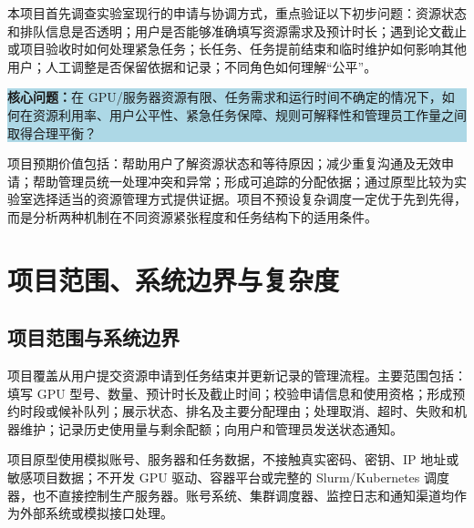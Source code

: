 \documentclass[UTF8,10.5pt,a4paper,fontset=mac]{ctexart}
\newcommand{\infobox}[1]{%
  \begin{center}
  \colorbox{lightblue}{\parbox{0.94\linewidth}{\vspace{0.35em}#1\vspace{0.35em}}}
  \end{center}}
\begin{document}
本项目首先调查实验室现行的申请与协调方式，重点验证以下初步问题：资源状态和排队信息是否透明；用户是否能够准确填写资源需求及预计时长；遇到论文截止或项目验收时如何处理紧急任务；长任务、任务提前结束和临时维护如何影响其他用户；人工调整是否保留依据和记录；不同角色如何理解“公平”。

\infobox{\textbf{核心问题：}在 GPU/服务器资源有限、任务需求和运行时间不确定的情况下，如何在资源利用率、用户公平性、紧急任务保障、规则可解释性和管理员工作量之间取得合理平衡？}

项目预期价值包括：帮助用户了解资源状态和等待原因；减少重复沟通及无效申请；帮助管理员统一处理冲突和异常；形成可追踪的分配依据；通过原型比较为实验室选择适当的资源管理方式提供证据。项目不预设复杂调度一定优于先到先得，而是分析两种机制在不同资源紧张程度和任务结构下的适用条件。

\section{项目范围、系统边界与复杂度}

\subsection{项目范围与系统边界}

项目覆盖从用户提交资源申请到任务结束并更新记录的管理流程。主要范围包括：填写 GPU 型号、数量、预计时长及截止时间；校验申请信息和使用资格；形成预约时段或候补队列；展示状态、排名及主要分配理由；处理取消、超时、失败和机器维护；记录历史使用量与剩余配额；向用户和管理员发送状态通知。

项目原型使用模拟账号、服务器和任务数据，不接触真实密码、密钥、IP 地址或敏感项目数据；不开发 GPU 驱动、容器平台或完整的 Slurm/Kubernetes 调度器，也不直接控制生产服务器。账号系统、集群调度器、监控日志和通知渠道均作为外部系统或模拟接口处理。

\begin{center}
\end{center}
\end{document}
